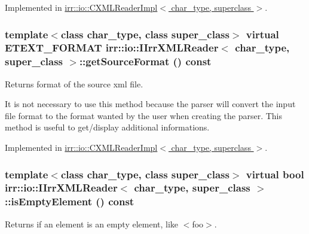 Implemented in \hyperlink{classirr_1_1io_1_1_c_x_m_l_reader_impl_dc53297eecc7760721a6bd4d3875c12b}{irr::io::CXMLReaderImpl$<$ char\_\-type, superclass $>$}.\hypertarget{classirr_1_1io_1_1_i_irr_x_m_l_reader_00998ef2d3a562d6b2b8302c3430322d}{
\subsubsection[{getSourceFormat}]{\setlength{\rightskip}{0pt plus 5cm}template$<$class char\_\-type, class super\_\-class$>$ virtual {\bf ETEXT\_\-FORMAT} {\bf irr::io::IIrrXMLReader}$<$ char\_\-type, super\_\-class $>$::getSourceFormat () const}}
\label{classirr_1_1io_1_1_i_irr_x_m_l_reader_00998ef2d3a562d6b2b8302c3430322d}


Returns format of the source xml file. 

It is not necessary to use this method because the parser will convert the input file format to the format wanted by the user when creating the parser. This method is useful to get/display additional informations. 

Implemented in \hyperlink{classirr_1_1io_1_1_c_x_m_l_reader_impl_0947ce3e44eb7c324ff1bdb430dedfa8}{irr::io::CXMLReaderImpl$<$ char\_\-type, superclass $>$}.\hypertarget{classirr_1_1io_1_1_i_irr_x_m_l_reader_3c85b144e0376c9ff90bce1bbbc338a9}{
\subsubsection[{isEmptyElement}]{\setlength{\rightskip}{0pt plus 5cm}template$<$class char\_\-type, class super\_\-class$>$ virtual bool {\bf irr::io::IIrrXMLReader}$<$ char\_\-type, super\_\-class $>$::isEmptyElement () const}}
\label{classirr_1_1io_1_1_i_irr_x_m_l_reader_3c85b144e0376c9ff90bce1bbbc338a9}


Returns if an element is an empty element, like $<$foo$>$. 



